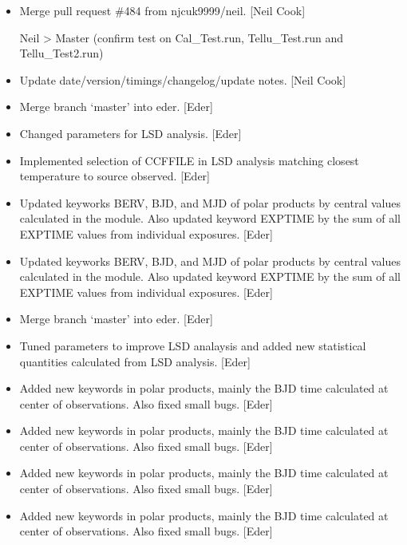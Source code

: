 \documentclass[a4paper,10pt,english]{report}
\begin{document}
\begin{itemize}
\item {} 
Merge pull request \#484 from njcuk9999/neil. {[}Neil Cook{]}

Neil \textendash{}\textgreater{} Master (confirm test on Cal\_Test.run, Tellu\_Test.run and Tellu\_Test2.run)

\item {} 
Update date/version/timings/changelog/update notes. {[}Neil Cook{]}

\item {} 
Merge branch ‘master’ into eder. {[}Eder{]}

\item {} 
Changed parameters for LSD analysis. {[}Eder{]}

\item {} 
Implemented selection of CCFFILE in LSD analysis matching closest
temperature to source observed. {[}Eder{]}

\item {} 
Updated keyworks BERV, BJD, and MJD of polar products by central
values calculated in the module. Also updated keyword EXPTIME by the
sum of all EXPTIME values from individual exposures. {[}Eder{]}

\item {} 
Updated keyworks BERV, BJD, and MJD of polar products by central
values calculated in the module. Also updated keyword EXPTIME by the
sum of all EXPTIME values from individual exposures. {[}Eder{]}

\item {} 
Merge branch ‘master’ into eder. {[}Eder{]}

\item {} 
Tuned parameters to improve LSD analaysis and added new statistical
quantities calculated from LSD analysis. {[}Eder{]}

\item {} 
Added new keywords in polar products, mainly the BJD time calculated
at center of observations. Also fixed small bugs. {[}Eder{]}

\item {} 
Added new keywords in polar products, mainly the BJD time calculated
at center of observations. Also fixed small bugs. {[}Eder{]}

\item {} 
Added new keywords in polar products, mainly the BJD time calculated
at center of observations. Also fixed small bugs. {[}Eder{]}

\item {} 
Added new keywords in polar products, mainly the BJD time calculated
at center of observations. Also fixed small bugs. {[}Eder{]}


\end{itemize}
\end{document}
